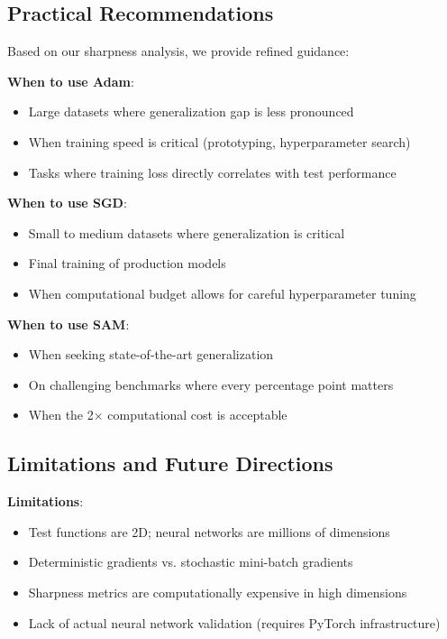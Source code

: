 \documentclass[12pt,a4paper]{article}
\begin{document}
\subsection{Practical Recommendations}

Based on our sharpness analysis, we provide refined guidance:

\textbf{When to use Adam}:
\begin{itemize}
    \item Large datasets where generalization gap is less pronounced
    \item When training speed is critical (prototyping, hyperparameter search)
    \item Tasks where training loss directly correlates with test performance
\end{itemize}

\textbf{When to use SGD}:
\begin{itemize}
    \item Small to medium datasets where generalization is critical
    \item Final training of production models
    \item When computational budget allows for careful hyperparameter tuning
\end{itemize}

\textbf{When to use SAM}:
\begin{itemize}
    \item When seeking state-of-the-art generalization
    \item On challenging benchmarks where every percentage point matters
    \item When the 2× computational cost is acceptable
\end{itemize}

\subsection{Limitations and Future Directions}

\textbf{Limitations}:
\begin{itemize}
    \item Test functions are 2D; neural networks are millions of dimensions
    \item Deterministic gradients vs. stochastic mini-batch gradients
    \item Sharpness metrics are computationally expensive in high dimensions
    \item Lack of actual neural network validation (requires PyTorch infrastructure)
\end{itemize}
\end{document}
